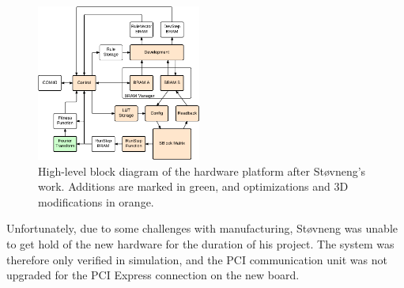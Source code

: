 \begin{figure}[!ht]
    \centering
    \includegraphics[width=0.48\textwidth]{figures/overview-stovneng}
    \caption{High-level block diagram of the hardware platform after Støvneng's work. Additions are marked in green, and optimizations and 3D modifications in orange.}
    \label{fig:overview-stovneng}
\end{figure}



Unfortunately, due to some challenges with manufacturing, Støvneng was unable to get hold of the new hardware for the duration of his project.
The system was therefore only verified in simulation, and the PCI communication unit was not upgraded for the PCI Express connection on the new board.

